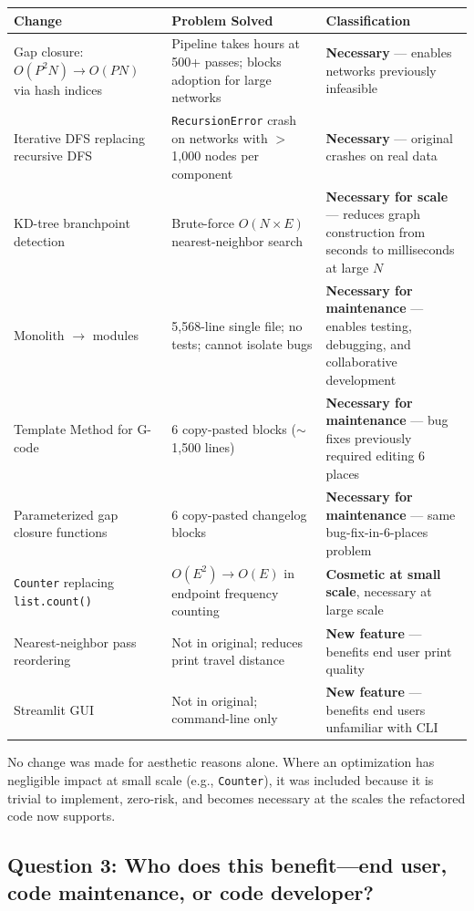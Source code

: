 \documentclass[11pt,a4paper]{article}
\begin{document}
\begin{longtable}{p{5cm}p{4cm}p{5cm}}
\toprule
\textbf{Change} & \textbf{Problem Solved} & \textbf{Classification} \\
\midrule
\endhead
Gap closure: $O(P^2N) \rightarrow O(PN)$ via hash indices & Pipeline takes hours at 500+ passes; blocks adoption for large networks & \textbf{Necessary} --- enables networks previously infeasible \\
\midrule
Iterative DFS replacing recursive DFS & \texttt{RecursionError} crash on networks with $>$1,000 nodes per component & \textbf{Necessary} --- original crashes on real data \\
\midrule
KD-tree branchpoint detection & Brute-force $O(N \times E)$ nearest-neighbor search & \textbf{Necessary for scale} --- reduces graph construction from seconds to milliseconds at large $N$ \\
\midrule
Monolith $\rightarrow$ modules & 5,568-line single file; no tests; cannot isolate bugs & \textbf{Necessary for maintenance} --- enables testing, debugging, and collaborative development \\
\midrule
Template Method for G-code & 6 copy-pasted blocks ($\sim$1,500 lines) & \textbf{Necessary for maintenance} --- bug fixes previously required editing 6 places \\
\midrule
Parameterized gap closure functions & 6 copy-pasted changelog blocks & \textbf{Necessary for maintenance} --- same bug-fix-in-6-places problem \\
\midrule
\texttt{Counter} replacing \texttt{list.count()} & $O(E^2) \rightarrow O(E)$ in endpoint frequency counting & \textbf{Cosmetic at small scale}, necessary at large scale \\
\midrule
Nearest-neighbor pass reordering & Not in original; reduces print travel distance & \textbf{New feature} --- benefits end user print quality \\
\midrule
Streamlit GUI & Not in original; command-line only & \textbf{New feature} --- benefits end users unfamiliar with CLI \\
\bottomrule
\end{longtable}

No change was made for aesthetic reasons alone. Where an optimization has negligible impact at small scale (e.g., \texttt{Counter}), it was included because it is trivial to implement, zero-risk, and becomes necessary at the scales the refactored code now supports.

\subsection{Question 3: Who does this benefit---end user, code maintenance, or code developer?}
\end{document}
